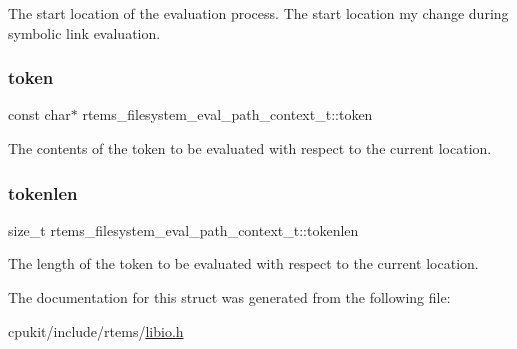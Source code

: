 The start location of the evaluation process. The start location my change during symbolic link evaluation. \mbox{\label{structrtems__filesystem__eval__path__context__t_ad04a4c94c347445b25ecba910af4a7a1}} 
\subsubsection{\texorpdfstring{token}{token}}
{\footnotesize\ttfamily const char$\ast$ rtems\+\_\+filesystem\+\_\+eval\+\_\+path\+\_\+context\+\_\+t\+::token}

The contents of the token to be evaluated with respect to the current location. \mbox{\label{structrtems__filesystem__eval__path__context__t_abd2a3eb23c5007e2e9f963ecb036992c}} 
\subsubsection{\texorpdfstring{tokenlen}{tokenlen}}
{\footnotesize\ttfamily size\+\_\+t rtems\+\_\+filesystem\+\_\+eval\+\_\+path\+\_\+context\+\_\+t\+::tokenlen}

The length of the token to be evaluated with respect to the current location. 

The documentation for this struct was generated from the following file\+:\begin{DoxyCompactItemize}
\item 
cpukit/include/rtems/\mbox{\hyperlink{libio_8h}{libio.\+h}}\end{DoxyCompactItemize}
